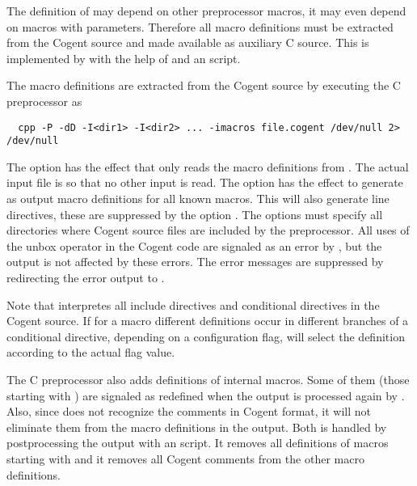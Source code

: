 The definition of  may depend on other preprocessor macros, it may even depend on macros with parameters.
Therefore all macro definitions must be extracted from the Cogent source and made available as auxiliary C source.
This is implemented by  with the help of  and an  script.

The macro definitions are extracted from the Cogent source  by executing the C preprocessor as
\begin{verbatim}
  cpp -P -dD -I<dir1> -I<dir2> ... -imacros file.cogent /dev/null 2> /dev/null
\end{verbatim}
The option  has the effect that  only reads the macro definitions from .
The actual input file is  so that no other input is read. The option  has the effect
to generate as output macro definitions for all known macros. This will also generate line directives, these are
suppressed by the option . The  options must specify all directories where Cogent source files
are included by the preprocessor. All uses of the unbox operator \code{\#} in the Cogent code are signaled as an 
error by , but the output is not affected by these errors. The error messages are suppressed by redirecting
the error output to .

Note that  interpretes all include directives and conditional directives in the Cogent source. If for a macro
different definitions occur in different branches of a conditional directive, depending on a configuration flag,
 will select the definition according to the actual flag value.

The C preprocessor also adds definitions of internal macros. Some of them (those starting with ) are 
signaled as redefined when the output is processed again by . Also, since  does not recognize
the comments in Cogent format, it will not eliminate them from the macro definitions in the output. Both is handled
by postprocessing the output with an  script. It removes all definitions of macros starting with 
and it removes all Cogent comments from the other macro definitions.

\subsubsection{}

